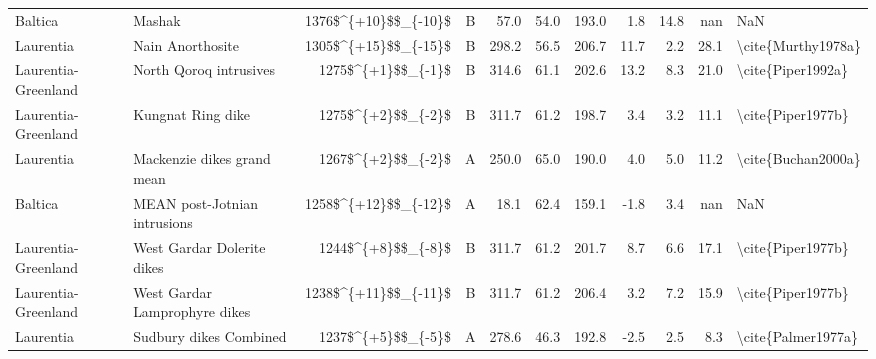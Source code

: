 \begin{longtable}{p{1 in}p{1 in}rrrrrrrr}
                       Baltica &                                             Mashak &   1376\$\textasciicircum \{+10\}\$\$\_\{-10\}\$ &      B &      57.0 &      54.0 & 193.0 &   1.8 &      14.8 &         nan &                                                NaN \\
                     Laurentia &                                   Nain Anorthosite &   1305\$\textasciicircum \{+15\}\$\$\_\{-15\}\$ &      B &     298.2 &      56.5 & 206.7 &  11.7 &       2.2 &        28.1 &                                 \textbackslash cite\{Murthy1978a\} \\
           Laurentia-Greenland &                             North Qoroq intrusives &     1275\$\textasciicircum \{+1\}\$\$\_\{-1\}\$ &      B &     314.6 &      61.1 & 202.6 &  13.2 &       8.3 &        21.0 &                                  \textbackslash cite\{Piper1992a\} \\
           Laurentia-Greenland &                                  Kungnat Ring dike &     1275\$\textasciicircum \{+2\}\$\$\_\{-2\}\$ &      B &     311.7 &      61.2 & 198.7 &   3.4 &       3.2 &        11.1 &                                  \textbackslash cite\{Piper1977b\} \\
                     Laurentia &                         Mackenzie dikes grand mean &     1267\$\textasciicircum \{+2\}\$\$\_\{-2\}\$ &      A &     250.0 &      65.0 & 190.0 &   4.0 &       5.0 &        11.2 &                                 \textbackslash cite\{Buchan2000a\} \\
                       Baltica &                       MEAN post-Jotnian intrusions &   1258\$\textasciicircum \{+12\}\$\$\_\{-12\}\$ &      A &      18.1 &      62.4 & 159.1 &  -1.8 &       3.4 &         nan &                                                NaN \\
           Laurentia-Greenland &                         West Gardar Dolerite dikes &     1244\$\textasciicircum \{+8\}\$\$\_\{-8\}\$ &      B &     311.7 &      61.2 & 201.7 &   8.7 &       6.6 &        17.1 &                                  \textbackslash cite\{Piper1977b\} \\
           Laurentia-Greenland &                      West Gardar Lamprophyre dikes &   1238\$\textasciicircum \{+11\}\$\$\_\{-11\}\$ &      B &     311.7 &      61.2 & 206.4 &   3.2 &       7.2 &        15.9 &                                  \textbackslash cite\{Piper1977b\} \\
                     Laurentia &                             Sudbury dikes Combined &     1237\$\textasciicircum \{+5\}\$\$\_\{-5\}\$ &      A &     278.6 &      46.3 & 192.8 &  -2.5 &       2.5 &         8.3 &                                 \textbackslash cite\{Palmer1977a\} \\

\end{longtable}
